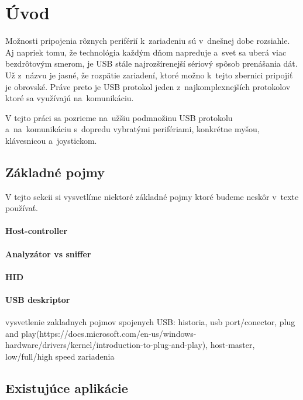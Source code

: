 \chapter{Úvod}

Možnosti pripojenia rôznych periférií k~zariadeniu sú v~dnešnej dobe rozsiahle. Aj napriek tomu, že technológia každým dňom napreduje a~svet sa uberá viac bezdrôtovým smerom, je USB stále najrozšírenejší sériový spôsob prenášania dát. Už z~názvu  je jasné, že rozpätie zariadení, ktoré možno k~tejto zbernici pripojiť je obrovské. Práve preto je USB protokol jeden z~najkomplexnejších protokolov ktoré sa využívajú na~komunikáciu.

V tejto práci sa pozrieme na~užšiu podmnožinu USB protokolu a~na~komunikáciu s~dopredu vybratými perifériami, konkrétne myšou, klávesnicou a~joystickom.

\section{Základné pojmy}

V tejto sekcii si vysvetlíme niektoré základné pojmy ktoré budeme neskôr v~texte používať.

\subsubsection{Host-controller}
\subsubsection{Analyzátor vs sniffer}
\subsubsection{HID}
\subsubsection{USB deskriptor}






vysvetlenie zakladnych pojmov spojenych USB: historia, usb port/conector, plug and play(https://docs.microsoft.com/en-us/windows-hardware/drivers/kernel/introduction-to-plug-and-play), host-master, low/full/high speed zariadenia

\section{Existujúce aplikácie}

